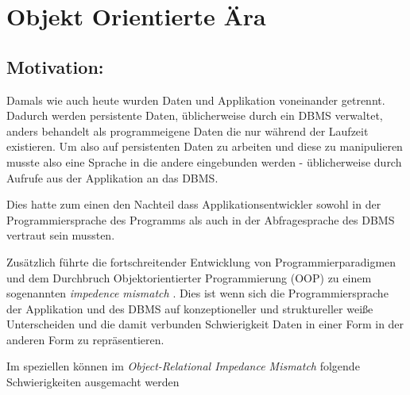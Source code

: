 



\section{Objekt Orientierte Ära}

\subsection{Motivation:}

Damals wie auch heute wurden Daten und Applikation voneinander getrennt. Dadurch werden persistente Daten, üblicherweise durch ein DBMS verwaltet, anders behandelt als programmeigene Daten die nur während der Laufzeit existieren. Um also auf persistenten Daten zu arbeiten und diese zu manipulieren musste also eine Sprache in die andere eingebunden werden - üblicherweise durch Aufrufe aus der Applikation an das DBMS.

Dies hatte zum einen den Nachteil dass Applikationsentwickler sowohl in der Programmiersprache des Programms als auch in der Abfragesprache des DBMS vertraut sein mussten.

Zusätzlich führte die fortschreitender Entwicklung von Programmierparadigmen und dem Durchbruch Objektorientierter Programmierung (OOP) zu einem sogenannten \emph{impedence mismatch} \cite{copeland1984}. Dies ist wenn sich die Programmiersprache der Applikation und des DBMS auf konzeptioneller und struktureller weiße Unterscheiden und die damit verbunden Schwierigkeit Daten in einer Form in der anderen Form zu repräsentieren.

Im speziellen können im \emph{Object-Relational Impedance Mismatch} folgende Schwierigkeiten ausgemacht werden \cite{ireland2009}


